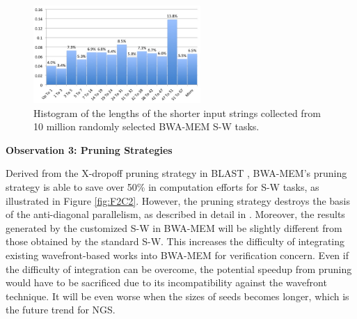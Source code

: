 \begin{figure}[!hbt]
	\begin{center}
		\includegraphics[width=2.5in]{Figures/Figure4C2.jpg}
		\caption {Histogram of the lengths of the shorter input strings collected from 10 million randomly selected BWA-MEM S-W tasks.}
		\label{fig:F4C2}
	\end{center}
\end{figure}
\vspace{-10pt}


\vspace{1pt}
\textbf{Observation 3: Pruning Strategies}
\vspace{1pt}

Derived from the X-dropoff pruning strategy in BLAST \cite{BLAST1990}, 
BWA-MEM's pruning strategy is able to save over 50\% in computation efforts for S-W tasks, as illustrated in Figure \ref{fig:F2C2}. 
However, the pruning strategy destroys the basis of the anti-diagonal parallelism, as described in detail in \cite{BWA-MEM}. 
Moreover, the results generated by the customized S-W in BWA-MEM will be slightly different from those obtained by the standard S-W. 
This increases the difficulty of integrating existing wavefront-based works into BWA-MEM for verification concern. 
Even if the difficulty of integration can be overcome, 
the potential speedup from pruning would have to be sacrificed due to its incompatibility against the wavefront technique.
It will be even worse when the sizes of seeds becomes longer, which is the future trend for NGS.

